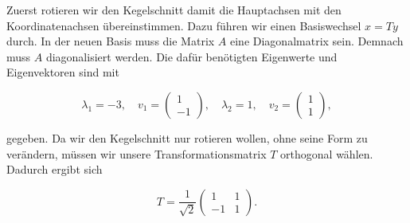\begin{figure}[h]
    \centering
\end{figure}

Zuerst rotieren wir den Kegelschnitt damit die Hauptachsen mit den Koordinatenachsen übereinstimmen. Dazu führen wir einen Basiswechsel \( x = Ty \) durch. In der neuen Basis muss die Matrix \( A \) eine Diagonalmatrix sein. Demnach muss \( A \) diagonalisiert werden. Die dafür benötigten Eigenwerte und Eigenvektoren sind mit 

\begin{equation*}
    \lambda_1 = -3, \quad v_1 = \begin{pmatrix} 1 \\ -1 \end{pmatrix}, \quad \lambda_2 = 1, \quad v_2 = \begin{pmatrix} 1 \\ 1 \end{pmatrix},
\end{equation*}

gegeben. Da wir den Kegelschnitt nur rotieren wollen, ohne seine Form zu verändern, müssen wir unsere Transformationsmatrix \( T \) orthogonal wählen. Dadurch ergibt sich 

\begin{equation*}
    T = \frac{1}{\sqrt{2}} \begin{pmatrix}
        1 & 1 \\
        -1 & 1
    \end{pmatrix}.
\end{equation*}

